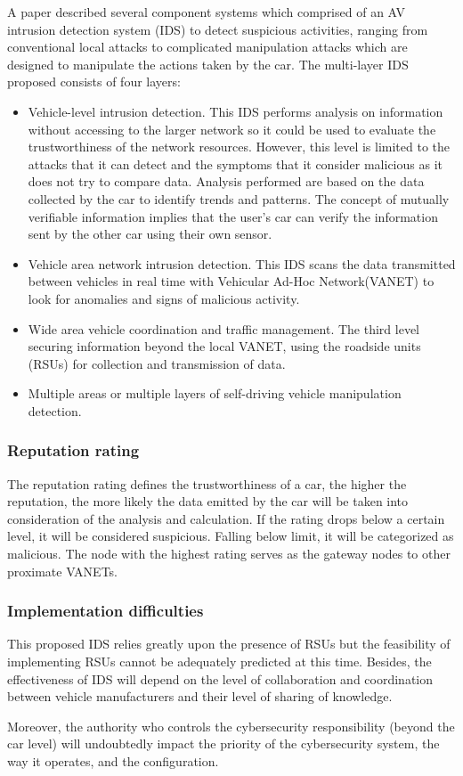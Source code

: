 A paper \cite{straub_cybersecurity_2017} described several component systems which comprised of an AV intrusion detection system (IDS) to detect suspicious activities, ranging from conventional local attacks to complicated manipulation attacks which are designed to manipulate the actions taken by the car. The multi-layer IDS proposed consists of four layers:
\begin{itemize}
  \item Vehicle-level intrusion detection. This IDS performs analysis on information without accessing to the larger network so it could be used to evaluate the trustworthiness of the network resources. However, this level is limited to the attacks that it can detect and the symptoms that it consider malicious as it does not try to compare data. Analysis performed are based on the data collected by the car to identify trends and patterns. The concept of mutually verifiable information implies that the user’s car can verify the information sent by the other car using their own sensor.

  \item Vehicle area network intrusion detection. This IDS scans the data transmitted between vehicles in real time with Vehicular Ad-Hoc Network(VANET) to look for anomalies and signs of malicious activity.
  
  \item Wide area vehicle coordination and traffic management. The third level securing information beyond the local VANET, using the roadside units (RSUs) for collection and transmission of data.
  
  \item Multiple areas or multiple layers of self-driving vehicle manipulation detection. 
\end{itemize}

\subsubsection {Reputation rating }
The reputation rating defines the trustworthiness of a car, the higher the reputation, the more likely the data emitted by the car will be taken into consideration of the analysis and calculation. If the rating drops below a certain level, it will be considered suspicious. Falling below limit, it will be categorized as malicious. The node with the highest rating serves as the gateway nodes to other proximate VANETs.

\subsubsection{Implementation difficulties}
This proposed IDS relies greatly upon the presence of RSUs but the feasibility of implementing RSUs cannot be adequately predicted at this time. Besides, the effectiveness of IDS will depend on the level of collaboration and coordination between vehicle manufacturers and their level of sharing of knowledge. 

Moreover, the authority who controls the cybersecurity responsibility (beyond the car level) will undoubtedly impact the priority of the cybersecurity system, the way it operates, and the configuration.